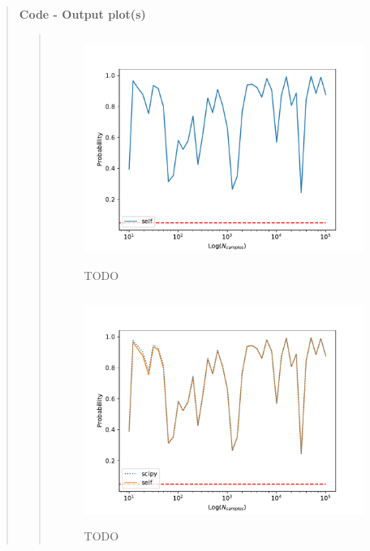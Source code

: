 \begin{quote}
\textbf{Code - Output plot(s)}
\begin{quote}
\begin{figure}[!ht]
\centering
\includegraphics[width=12cm, height=7.5cm]{./Plots/1_plot_ks_test_self.pdf}
\caption{TODO}
\end{figure}

\begin{figure}[!hb]
\centering
\includegraphics[width=12cm, height=7.5cm]{./Plots/1_plot_ks_test_self_scipy.pdf}
\caption{TODO}
\end{figure}

\end{quote}



\end{quote}
\newpage


%

%


%
\newpage











